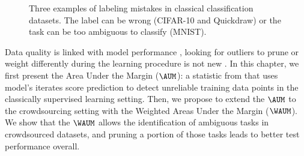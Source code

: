 \begin{figure}[thb]
\begin{minipage}{.3\linewidth}
\end{minipage}%
\hfill
\begin{minipage}{.3\linewidth}
\centering
{}
\end{minipage}
\caption{Three examples of labeling mistakes in classical classification datasets. The label can be wrong (CIFAR-10 and Quickdraw) or the task can be too ambiguous to classify (MNIST).}
\label{fig:label_mistakes}
\end{figure}


Data quality is linked with model performance \citep{budach2022effects}, looking for outliers to prune or weight differently during the learning procedure is not new \citep{angelova2004data}.
In this chapter, we first present the Area Under the Margin ($\AUM$): a statistic from \citet{pleiss_identifying_2020} that uses model's iterates score prediction to detect unreliable training data points in the classically supervised learning setting.
Then, we propose to extend the $\AUM$ to the crowdsourcing setting with the Weighted Areas Under the Margin ($\WAUM$).
We show that the $\WAUM$ allows the identification of ambiguous tasks in crowdsourced datasets, and pruning a portion of those tasks leads to better test performance overall.


